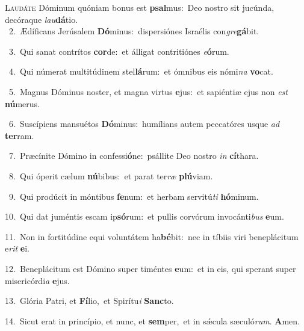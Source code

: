 \lettrine{\initial\textcolor{\initialcolor}{L}}{audáte} Dóminum quóniam bonus est \textbf{psal}\-mus:~\star Deo nostro sit jucúnda, decóraque \textit{lau}\-\textbf{dá}tio.\\
{\numbfont\textcolor{\numbcolor}{~2.}}~Ædíficans Jerúsalem \textbf{Dó}\-minus:~\star dispersiónes Israélis con\-\textit{gre}\-\textbf{gá}bit.\par
{\numbfont\textcolor{\numbcolor}{~3.}}~Qui sanat contrítos \textbf{cor}\-de:~\star et álligat contritiónes \textit{e}\-\textbf{ó}rum.\par
{\numbfont\textcolor{\numbcolor}{~4.}}~Qui númerat multitúdinem stel\-\textbf{lá}\-rum:~\star et ómnibus eis nómi\textit{na} \textbf{vo}\-cat.\par
{\numbfont\textcolor{\numbcolor}{~5.}}~Magnus Dóminus noster, et magna virtus \textbf{e}\-jus:~\star et sapiéntiæ ejus non \textit{est} \textbf{nú}\-merus.\par
{\numbfont\textcolor{\numbcolor}{~6.}}~Suscípiens mansuétos \textbf{Dó}\-minus:~\star humílians autem peccatóres usque \textit{ad} \textbf{ter}\-ram.\par
{\numbfont\textcolor{\numbcolor}{~7.}}~Præcínite Dómino in confessi\-\textbf{ó}\-ne:~\star psállite Deo nostro \textit{in} \textbf{cí}\-thara.\par
{\numbfont\textcolor{\numbcolor}{~8.}}~Qui óperit cælum \textbf{nú}\-bibus:~\star et parat ter\textit{ræ} \textbf{plú}\-viam.\par
{\numbfont\textcolor{\numbcolor}{~9.}}~Qui prodúcit in móntibus \textbf{fe}\-num:~\star et herbam servitú\textit{ti} \textbf{hó}\-minum.\par
{\numbfont\textcolor{\numbcolor}{10.}}~Qui dat juméntis escam ip\-\textbf{só}\-rum:~\star et pullis corvórum invocánti\textit{bus} \textbf{e}\-um.\par
{\numbfont\textcolor{\numbcolor}{11.}}~Non in fortitúdine equi voluntátem ha\-\textbf{bé}\-bit:~\star nec in tíbiis viri beneplácitum e\textit{rit} \textbf{e}\-i.\par
{\numbfont\textcolor{\numbcolor}{12.}}~Beneplácitum est Dómino super timéntes \textbf{e}\-um:~\star et in eis, qui sperant super misericórdi\textit{a} \textbf{e}\-jus.\par
{\numbfont\textcolor{\numbcolor}{13.}}~Glória Patri, et \textbf{Fí}\-lio,~\star et Spirítu\textit{i} \textbf{Sanc}\-to.\par
{\numbfont\textcolor{\numbcolor}{14.}}~Sicut erat in princípio, et nunc, et \textbf{sem}\-per,~\star et in sǽcula sæculó\-\textit{rum}\-. \textbf{A}\-men.\par
